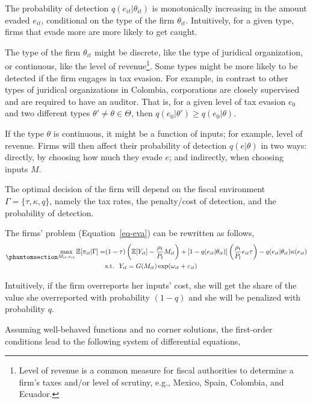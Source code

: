 \documentclass[
  12pt]{article}
\theoremstyle{definition}
\theoremstyle{remark}
\begin{document}
The probability of detection \(q(e_{it}|\theta_{it})\) is monotonically
increasing in the amount evaded \(e_{it}\), conditional on the type of
the firm \(\theta_{it}\). Intuitively, for a given type, firms that
evade more are more likely to get caught.

The type of the firm \(\theta_{it}\) might be discrete, like the type of
juridical organization, or continuous, like the level of
revenue\footnote{Level of revenue is a common measure for fiscal
  authorities to determine a firm's taxes and/or level of scrutiny,
  e.g., Mexico, Spain, Colombia, and Ecuador. }. Some
types might be more likely to be detected if the firm engages in tax
evasion. For example, in contrast to other types of juridical
organizations in Colombia, corporations are closely supervised and are
required to have an auditor. That is, for a given level of tax evasion
\(e_0\) and two different types
\(\theta' \not= \theta \in \mathbfcal{\Theta}\), then
\(q(e_0|\theta')\ge q(e_0|\theta)\).

If the type \(\theta\) is continuous, it might be a function of inputs;
for example, level of revenue. Firms will then affect their probability
of detection \(q(e|\theta)\) in two ways: directly, by choosing how much
they evade \(e\); and indirectly, when choosing inputs \(M\).

The optimal decision of the firm will depend on the fiscal environment
\(\Gamma=\{\tau, \kappa, q \}\), namely the tax rates, the penalty/cost
of detection, and the probability of detection.

The firms' problem (Equation~\ref{eq-eva}) can be rewritten as follows,
\begin{equation}\phantomsection\label{eq-eva-2}{
\begin{aligned}
  \max_{M_{it},e_{it}} \mathbb{E}[\pi_{it}|\Gamma] = &(1-\tau)\left(\mathbb{E}[Y_{it}]-\frac{\rho_{t}}{P_t} M_{it}\right)+[1-q(e_{it}|\theta_{it})]\left(\frac{\rho_{t}}{P_t}e_{it}\tau\right)
  -q(e_{it}|\theta_{it})\kappa(e_{it}) \\
  &\text{s.t. }\; Y_{it}=G(M_{it})\exp(\omega_{it}+\varepsilon_{it})
\end{aligned}
}\end{equation}

Intuitively, if the firm overreports her inputs' cost, she will get the
share of the value she overreported with probability \((1-q)\) and she
will be penalized with probability \(q\).

Assuming well-behaved functions and no corner solutions, the first-order
conditions lead to the following system of differential equations,
\end{document}
